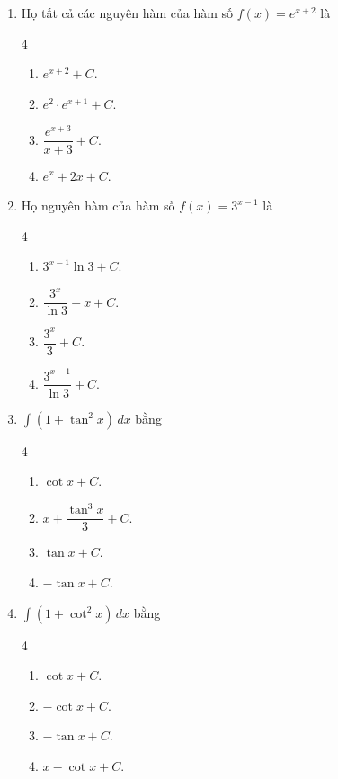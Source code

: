 \documentclass[12pt]{article}
\begin{document}
\begin{enumerate}[label=\textbf{Câu \arabic*.}]
		\item Họ tất cả các nguyên hàm của hàm số $f(x) = e^{x+2}$ là
		\begin{multicols}{4}
			\begin{enumerate}[label=\textbf{\Alph*.}]
				\item $e^{x+2} + C$.
				\item $e^2 \cdot e^{x+1} + C$.
				\item $\dfrac{e^{x+3}}{x+3} + C$.
				\item $e^{x} + 2x + C$.
			\end{enumerate}
		\end{multicols}
		
		\item Họ nguyên hàm của hàm số $f(x) = 3^{x-1}$ là
		\begin{multicols}{4}
			\begin{enumerate}[label=\textbf{\Alph*.}]
				
				\item $3^{x-1} \ln 3 + C$.
				\item $\dfrac{3^x}{\ln 3} - x + C$.
				\item $\dfrac{3^x}{3} + C$.
				\item $\dfrac{3^{x-1}}{\ln 3} + C$.
			\end{enumerate}
		\end{multicols}
		
		\item $\displaystyle \int (1 + \tan^2 x) \,dx$ bằng
		\begin{multicols}{4}
			\begin{enumerate}[label=\textbf{\Alph*.}]
				
				\item $\cot x + C$.
				\item $x + \dfrac{\tan^3 x}{3} + C$.
				\item $\tan x + C$.
				\item $-\tan x + C$.
			\end{enumerate}
		\end{multicols}
		
		\item $\displaystyle \int (1 + \cot^2 x) \,dx$ bằng
		\begin{multicols}{4}
			\begin{enumerate}[label=\textbf{\Alph*.}]
				
				\item $\cot x + C$.
				\item $-\cot x + C$.
				\item $-\tan x + C$.
				\item $x - \cot x + C$.
			\end{enumerate}
		\end{multicols}
		

\end{enumerate}
\end{document}
